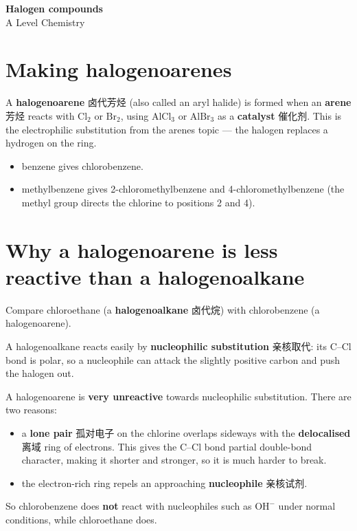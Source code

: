 \documentclass[11pt]{article}
\begin{document}
\begin{center}
  {\LARGE\bfseries Halogen compounds}\\[0.35em]
  {\large A Level Chemistry}
\end{center}
\vspace{0.6em}

\section*{Making halogenoarenes}

A \textbf{halogenoarene} 卤代芳烃 (also called an aryl halide) is formed when an \textbf{arene} 芳烃 reacts with $\text{Cl}_2$ or $\text{Br}_2$, using $\text{AlCl}_3$ or $\text{AlBr}_3$ as a \textbf{catalyst} 催化剂. This is the electrophilic substitution from the arenes topic — the halogen replaces a hydrogen on the ring.

\begin{itemize}
\item benzene gives chlorobenzene.

\item methylbenzene gives 2-chloromethylbenzene and 4-chloromethylbenzene (the methyl group directs the chlorine to positions 2 and 4).

\end{itemize}

\section*{Why a halogenoarene is less reactive than a halogenoalkane}

Compare chloroethane (a \textbf{halogenoalkane} 卤代烷) with chlorobenzene (a halogenoarene).

A halogenoalkane reacts easily by \textbf{nucleophilic substitution} 亲核取代: its C–Cl bond is polar, so a nucleophile can attack the slightly positive carbon and push the halogen out.

A halogenoarene is \textbf{very unreactive} towards nucleophilic substitution. There are two reasons:

\begin{itemize}
\item a \textbf{lone pair} 孤对电子 on the chlorine overlaps sideways with the \textbf{delocalised} 离域 ring of electrons. This gives the C–Cl bond partial double-bond character, making it shorter and stronger, so it is much harder to break.

\item the electron-rich ring repels an approaching \textbf{nucleophile} 亲核试剂.

\end{itemize}

So chlorobenzene does \textbf{not} react with nucleophiles such as $\text{OH}^-$ under normal conditions, while chloroethane does.
\end{document}
